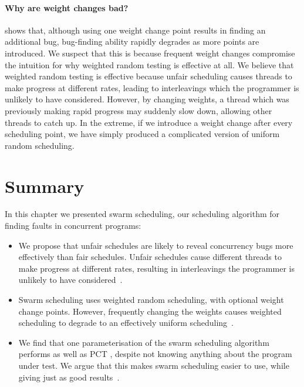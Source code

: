 \paragraph{Why are weight changes bad?}
 shows that, although using one weight change
point results in finding an additional bug, bug-finding ability
rapidly degrades as more points are introduced.  We suspect that this
is because frequent weight changes compromise the intuition for why
weighted random testing is effective at all.  We believe that weighted
random testing is effective because unfair scheduling causes threads
to make progress at different rates, leading to interleavings which
the programmer is unlikely to have considered.  However, by changing
weights, a thread which was previously making rapid progress may
suddenly slow down, allowing other threads to catch up.  In the
extreme, if we introduce a weight change after every scheduling point,
we have simply produced a complicated version of uniform random
scheduling.

\section{Summary}

In this chapter we presented swarm scheduling, our scheduling
algorithm for finding faults in concurrent programs:

\begin{itemize}
\item We propose that unfair schedules are likely to reveal
  concurrency bugs more effectively than fair schedules.  Unfair
  schedules cause different threads to make progress at different
  rates, resulting in interleavings the programmer is unlikely to have
  considered~.

\item Swarm scheduling uses weighted random scheduling, with optional
  weight change points.  However, frequently changing the weights
  causes weighted scheduling to degrade to an effectively uniform
  scheduling~.

\item We find that one parameterisation of the swarm scheduling
  algorithm performs as well as PCT \parencite{burckhardt2010}, despite not
  knowing anything about the program under test.  We argue that this
  makes swarm scheduling easier to use, while giving just as good
  results~.
\end{itemize}

